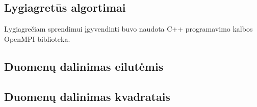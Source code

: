 \documentclass{VUMIFPSbakalaurinis}
\begin{document}
\subsection{Lygiagretūs algortimai}

Lygiagrečiam sprendimui įgyvendinti buvo naudota C++ programavimo kalbos OpenMPI biblioteka.

\subsection{Duomenų dalinimas eilutėmis}

\subsection{Duomenų dalinimas kvadratais}





\end{document}
